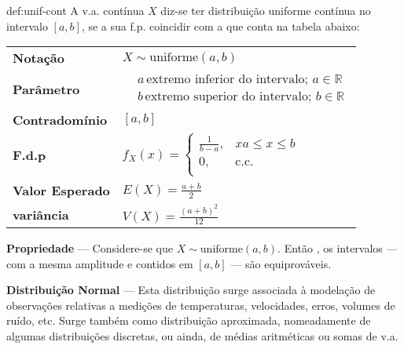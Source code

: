 \begin{theo}{def:unif-cont}\label{def:unif-cont}
\noindent A v.a. contínua $X$ diz-se ter distribuição uniforme contínua no intervalo $[a,b]$, se a sua f.p. coincidir com a que conta na tabela abaixo:

\vspace{1 em}
\begin{center}
\begin{tabular}{p{4cm}p{8cm}}
\toprule
\textbf{Notação} & $X \sim \text{uniforme}(a,b)$\\
\addlinespace
\textbf{Parâmetro} & $\begin{aligned}
                        &a\, \text{extremo inferior do intervalo; }a \in \mathbb{R}\\
                        &b\, \text{extremo superior do intervalo; }b \in \mathbb{R}
                     \end{aligned}$\\
\addlinespace
\textbf{Contradomínio} & $[a,b]$\\
\addlinespace
\textbf{F.d.p} & $f_X(x) = \left\{
                                \begin{array}{ll}
                                      \frac{1}{b - a}, & xa \leq x \leq b\\
                                       0, & \text{c.c.}\\
                                \end{array} 
                          \right.$\\
\addlinespace
\textbf{Valor Esperado} & $E(X) = \frac{a + b}{2}$\\
\addlinespace
\textbf{variância} & $V(X) = \frac{(a + b)^2}{12}$\\
\bottomrule
\end{tabular}
\end{center}

\noindent\textbf{Propriedade} --- Considere-se que $X \sim \text{uniforme}(a,b)$. Então , os intervalos --- com a mesma amplitude e contidos em $[a,b]$ --- são equiprováveis.
\vspace{0.5 em}
\end{theo}


\noindent \textbf{Distribuição Normal} --- Esta distribuição surge associada à modelação de observações relativas a medições de temperaturas, velocidades, erros, volumes de ruído, etc. Surge também como distribuição aproximada, nomeadamente de algumas distribuições discretas, ou ainda, de médias aritméticas ou somas de v.a.

